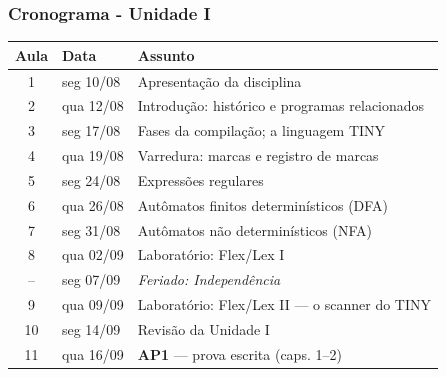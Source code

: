 \documentclass[table]{beamer}
\begin{document}
\begin{frame}
   \frametitle{Cronograma - Unidade I}
   \scriptsize
   \begin{center}
   \begin{tabular}{@{}cl p{6.6cm}@{}}
      \toprule
      \textbf{Aula} & \textbf{Data} & \textbf{Assunto} \\
      \midrule
      1  & seg 10/08 & Apresentação da disciplina \\
      2  & qua 12/08 & Introdução: histórico e programas relacionados \\
      3  & seg 17/08 & Fases da compilação; a linguagem TINY \\
      4  & qua 19/08 & Varredura: marcas e registro de marcas \\
      5  & seg 24/08 & Expressões regulares \\
      6  & qua 26/08 & Autômatos finitos determinísticos (DFA) \\
      7  & seg 31/08 & Autômatos não determinísticos (NFA) \\
      8  & qua 02/09 & Laboratório: Flex/Lex I \\
      \midrule
      -- & seg 07/09 & \textit{Feriado: Independência} \\
      \midrule
      9  & qua 09/09 & Laboratório: Flex/Lex II --- o scanner do TINY \\
      10 & seg 14/09 & Revisão da Unidade I \\
      11 & qua 16/09 & \textbf{AP1} --- prova escrita (caps. 1--2) \\
      \bottomrule
   \end{tabular}
   \end{center}
\end{frame}
\end{document}
